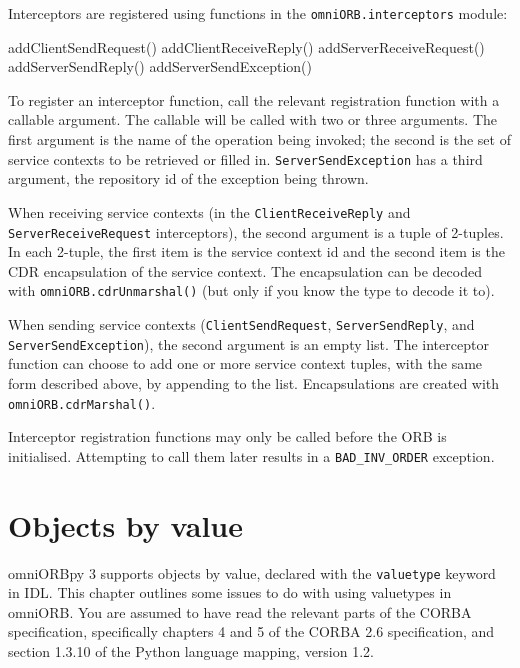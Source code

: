 \documentclass[draft,11pt,twoside,a4paper]{book}
\newcommand{\code}[1]{\texttt{#1}}
\newcommand{\op}[1]{\texttt{#1()}}
\newcommand{\dsc}{\discretionary{}{}{}}
\begin{document}
Interceptors are registered using functions in the
\code{omniORB.interceptors} module:

\begin{pylisting}
  addClientSendRequest()
  addClientReceiveReply()
  addServerReceiveRequest()
  addServerSendReply()
  addServerSendException()
\end{pylisting}

To register an interceptor function, call the relevant registration
function with a callable argument. The callable will be called with
two or three arguments. The first argument is the name of the
operation being invoked; the second is the set of service contexts to
be retrieved or filled in. \code{ServerSendException} has a third
argument, the repository id of the exception being thrown.

When receiving service contexts (in the \code{ClientReceiveReply} and
\code{Server\dsc{}ReceiveRequest} interceptors), the second argument
is a tuple of 2-tuples. In each 2-tuple, the first item is the service
context id and the second item is the CDR encapsulation of the service
context. The encapsulation can be decoded with
\op{omniORB.cdrUnmarshal} (but only if you know the type to decode it
to).

When sending service contexts (\code{ClientSendRequest},
\code{ServerSendReply}, and \code{ServerSendException}), the second
argument is an empty list. The interceptor function can choose to add
one or more service context tuples, with the same form described
above, by appending to the list.  Encapsulations are created with
\op{omniORB.cdrMarshal}.

Interceptor registration functions may only be called before the ORB
is initialised. Attempting to call them later results in a
\code{BAD\_INV\_ORDER} exception.





\chapter{Objects by value}
\label{chap:valuetype}

omniORBpy 3 supports objects by value, declared with the
\code{valuetype} keyword in IDL. This chapter outlines some issues to
do with using valuetypes in omniORB. You are assumed to have read the
relevant parts of the CORBA specification, specifically chapters 4 and
5 of the CORBA 2.6 specification, and section 1.3.10 of the Python
language mapping, version 1.2.
\end{document}

